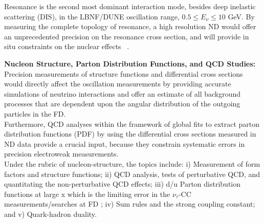 Resonance is the second most dominant interaction mode, besides deep inelastic scattering (DIS),  
in the LBNF/DUNE oscillation range, $0.5 \leq E_\nu \leq 10$ GeV.
 By measuring the complete 
topology of resonance, a high resolution ND 
would offer an unprecedented precision on the resonance cross section, and will provide in situ constraints on the 
nuclear effects ~\cite{ND-RES}.  




\vspace{0.25cm} 
\noindent 
{\bf Nucleon Structure, Parton Distribution Functions, and QCD Studies:} 
Precision measurements of  structure functions and 
differential cross sections would directly affect the oscillation measurements 
by providing accurate simulations of neutrino interactions and offer an estimate of 
all background processes that are dependent upon the angular distribution of 
the outgoing particles in the FD. \\
Furthermore, QCD analyses within the framework of global fits to 
extract parton distribution functions (PDF) by using the differential cross sections 
measured in ND data provide a crucial input,  because they  constrain systematic errors in 
precision electroweak measurements.\\
Under the rubric of nucleon-structure, the topics include: i) Measurement of form factors and structure functions; ii) QCD analysis,  tests of perturbative QCD,  and quantitating the non-perturbative 
QCD effects; iii) d/u Parton distribution functions at large x which is the limiting error in the 
$\nu_\tau$-CC measurements/searches at FD ; iv) Sum rules and the strong coupling constant; and v) Quark-hadron duality. 
%
%
%

